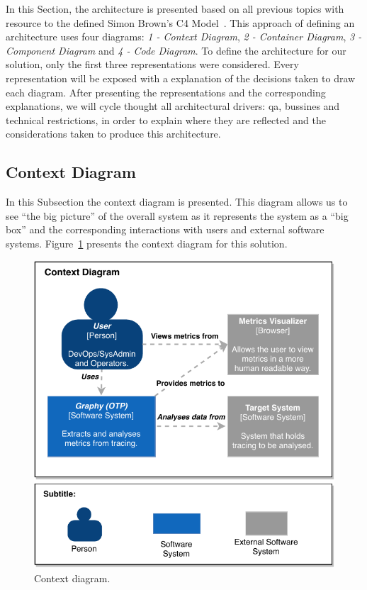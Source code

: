 In this Section, the architecture is presented based on all previous topics with resource to the defined Simon Brown’s C4 Model~\cite{simon_browns_c4_model}. This approach of defining an architecture uses four diagrams: \emph{1 - Context Diagram}, \emph{2 - Container Diagram}, \emph{3 - Component Diagram} and \emph{4 - Code Diagram}. To define the architecture for our solution, only the first three representations were considered. Every representation will be exposed with a explanation of the decisions taken to draw each diagram. After presenting the representations and the corresponding explanations, we will cycle thought all architectural drivers: \gls{qa}, bussines and technical restrictions, in order to explain where they are reflected and the considerations taken to produce this architecture.

\subsection{Context Diagram}
\label{subsec:context_diagram}

In this Subsection the context diagram is presented. This diagram allows us to see ``the big picture'' of the overall system as it represents the system as a ``big box'' and the corresponding interactions with users and external software systems. Figure~\ref{fig:context_diagram} presents the context diagram for this solution.

\begin{figure}[H]
    \centering
    \includegraphics[width=1.0\textwidth]{images/context_diagram.pdf}
    \caption{Context diagram.}
    \label{fig:context_diagram}
\end{figure}

